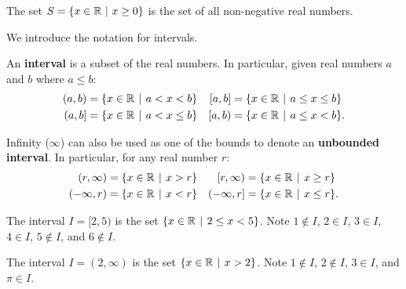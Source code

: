 \begin{example}
    The set $S = \{x \in \mathbb{R} \ | \ x \geq 0 \}$ is the set of all non-negative real numbers.
\end{example}

We introduce the notation for intervals.
\begin{definition}
    An \textbf{interval} is a subset of the real numbers. In particular, given real numbers $a$ and $b$ where $a \leq b$:
    \begin{align*}
        (a,b) &= \{x \in \R \vert a < x < b\} & [a,b] &= \{x \in \R \vert a \leq x \leq b\}\\
        (a,b] &= \{x \in \R \vert a < x \leq b\} & [a,b) &= \{x \in \R \vert a \leq x < b\}.
    \end{align*}

    Infinity ($\infty$) can also be used as one of the bounds to denote an \textbf{unbounded interval}. In particular, for any real number $r$:
    \begin{align*}
        (r, \infty) &= \{x \in \R \vert x > r\} & [r, \infty) &= \{x \in \R \vert x \geq r\}\\
        (-\infty,r) &= \{x \in \R \vert x < r\} & (-\infty,r] &= \{x \in \R \vert x \leq r\}.
    \end{align*}
\end{definition}
\begin{example}
    The interval $I = [2, 5)$ is the set $\{x \in \R \vert 2 \leq x < 5\}$. Note $1 \notin I$, $2 \in I$, $3 \in I$, $4 \in I$, $5 \notin I$, and $6 \notin I$.
\end{example}
\begin{example}
    The interval $I = (2, \infty)$ is the set $\{x \in \R \vert x > 2\}$. Note $1 \notin I$, $2 \notin I$, $3 \in I$, and $\pi \in I$.
\end{example}

